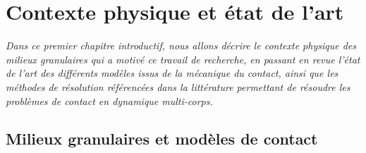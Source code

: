 \chapter{Contexte physique et état de l'art}\label{chap:introduction}

\vspace{1cm}

\textit{Dans ce premier chapitre introductif, nous allons décrire le contexte physique des milieux granulaires qui a motivé ce travail de recherche, en passant en revue l'état de l'art des différents modèles issus de la mécanique du contact, ainsi que les méthodes de résolution référencées dans la littérature permettant de résoudre les problèmes de contact en dynamique multi-corps.}

\vspace{1cm}

\minitoc

\newpage

\section{Milieux granulaires et modèles de contact}

